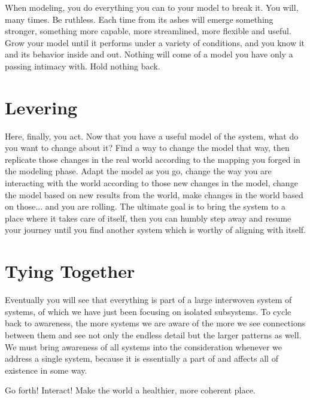 \documentclass[11pt]{article}
\begin{document}
When modeling, you do everything you can to your model to break it.  You will, many times.  Be ruthless.  Each time from its ashes will emerge something stronger, something more capable, more streamlined, more flexible and useful.  Grow your model until it performs under a variety of conditions, and you know it and its behavior inside and out.  Nothing will come of a model you have only a passing intimacy with.  Hold nothing back.

\section{Levering}

Here, finally, you act.  Now that you have a useful model of the system, what do you want to change about it?  Find a way to change the model that way, then replicate those changes in the real world according to the mapping you forged in the modeling phase.  Adapt the model as you go, change the way you are interacting with the world according to those new changes in the model, change the model based on new results from the world, make changes in the world based on those... and you are rolling.  The ultimate goal is to bring the system to a place where it takes care of itself, then you can humbly step away and resume your journey until you find another system which is worthy of aligning with itself.  

\section{Tying Together}

Eventually you will see that everything is part of a large interwoven system of systems, of which we have just been focusing on isolated subsystems.  To cycle back to awareness, the more systems we are aware of the more we see connections between them and see not only the endless detail but the larger patterns as well.  We must bring awareness of all systems into the consideration whenever we address a single system, because it is essentially a part of and affects all of existence in some way.  

Go forth!  Interact!  Make the world a healthier, more coherent place.
\end{document}
